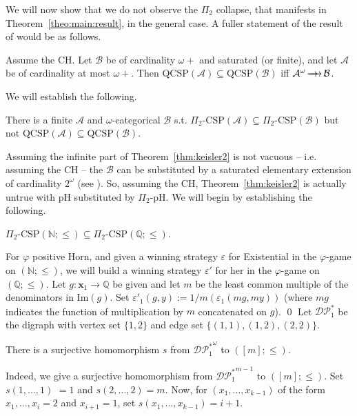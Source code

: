 \documentclass{LMCS}
\newcommand{\tuple}[1]{\ensuremath{\mathbf{#1}}}
\newcommand{\surhom}{
  \ensuremath{
      \negthinspace 
      \longrightarrow
      \hspace{-5mm} \rightarrow \hspace{1mm}
  }
}
\begin{document}
We will now show that we do not observe the $\Pi_2$ collapse, that manifests in Theorem~\ref{theo:main:result}, in the general case. A fuller statement of the result of \cite{Keisler65} would be as follows.
\begin{thm}
\label{thm:keisler2}
Assume the CH. Let $\mathcal{B}$ be of cardinality $\omega+$ and saturated (or finite), and let $\mathcal{A}$ be of cardinality at most $\omega+$. Then $\mathrm{QCSP}(\mathcal{A})  \subseteq \mathrm{QCSP}(\mathcal{B})$ iff $\mathcal{A}^\omega \surhom \mathcal{B}$.
\end{thm}
\noindent We will establish the following.
\begin{prop}
\label{prop:counterexample}
There is a finite $\mathcal{A}$ and $\omega$-categorical $\mathcal{B}$ s.t. $\Pi_2\mbox{-}\mathrm{CSP}(\mathcal{A})  \subseteq \Pi_2\mbox{-}\mathrm{CSP}(\mathcal{B})$ but not $\mathrm{QCSP}(\mathcal{A})  \subseteq \mathrm{QCSP}(\mathcal{B})$.
\end{prop}
\noindent Assuming the infinite part of Theorem~\ref{thm:keisler2} is not vacuous -- i.e. assuming the CH -- the $\mathcal{B}$ can be substituted by a saturated elementary extension of cardinality $2^\omega$ (see \cite{Marker}). So, assuming the CH, Theorem~\ref{thm:keisler2} is actually untrue with pH substituted by $\Pi_2$-pH. We will begin by establishing the following.
\begin{lem}
\label{lem:NandQ}
$\Pi_2\mbox{-}\mathrm{CSP}(\mathbb{N};\leq)  \subseteq \Pi_2\mbox{-}\mathrm{CSP}(\mathbb{Q};\leq)$.
\end{lem}
\proof
For $\varphi$ positive Horn, and given a winning strategy $\varepsilon$ for Existential in the $\varphi$-game on $(\mathbb{N};\leq)$, we will build a winning strategy $\varepsilon'$ for her in the $\varphi$-game on $(\mathbb{Q};\leq)$. Let $g:\tuple{x}_1\rightarrow \mathbb{Q}$ be given and let $m$ be the least common multiple of the denominators in $\mathrm{Im}(g)$.
Set $\varepsilon'_1(g,y):=1/m(\varepsilon_1(mg,my))$ (where $mg$ indicates the function of multiplication by $m$ concatenated on $g$).
\qed
\noindent Let $\mathcal{DP}^*_1$ be the digraph with vertex set $\{1,2\}$ and edge set $\{(1,1),(1,2),(2,2)\}$.
\begin{lem}
\label{lem:lately}
There is a surjective homomorphism $s$ from ${\mathcal{DP}^*_1}^\omega$ to $([m];\leq)$.
\end{lem}
\proof
Indeed, we give a surjective homomorphism from ${\mathcal{DP}^*_1}^{m-1}$ to $([m];\leq)$. Set $s(1,\ldots,1)$ $=1$ and $s(2,\ldots,2)=m$. Now, for $(x_1,\ldots,x_{k-1})$ of the form $x_1,\ldots,x_i=2$ and $x_{i+1}=1$, set $s(x_1,\ldots,x_{k-1})=i+1$.
\end{document}
